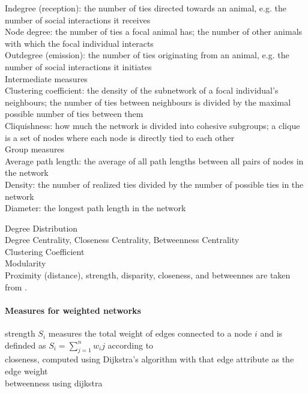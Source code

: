Indegree (reception): the number of ties directed towards
an animal, e.g. the number of social interactions it receives\\

Node degree: the number of ties a focal animal has; the
number of other animals with which the focal individual
interacts\\

Outdegree (emission): the number of ties originating from
an animal, e.g. the number of social interactions it initiates\\

Intermediate measures\\

Clustering coefficient: the density of the subnetwork of a focal
individual’s neighbours; the number of ties between
neighbours is divided by the maximal possible number of
ties between them\\

Cliquishness: how much the network is divided into cohesive
subgroups; a clique is a set of nodes where each node
is directly tied to each other\\

Group measures\\

Average path length: the average of all path lengths between
all pairs of nodes in the network\\

Density: the number of realized ties divided by the number
of possible ties in the network\\

Diameter: the longest path length in the network\\
\textcite{wey2008social}


Degree Distribution\\
Degree Centrality, Closeness Centrality, Betweenness Centrality\\
Clustering Coefficient\\
Modularity\\

Proximity (distance), strength, disparity, closeness, and betweennes are taken from \textcite{jeanson2012long}.\\

\paragraph*{Measures for weighted networks}
strength $S_i$ measures the total weight of edges connected to a node $i$ and is definded as $S_i = \sum_{j=1}^{n}w_ij$ according to~\textcite{barrat2004architecture}\\
closeness, computed using Dijkstra’s algorithm with that edge attribute as the edge weight~\cite{newman2001scientific}\\
betweenness using dijkstra~\cite{brandes2001faster}\\

